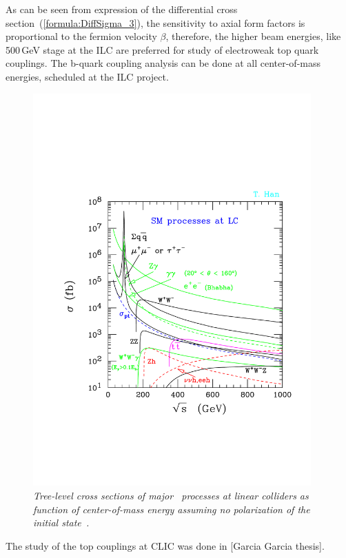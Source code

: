 As can be seen from expression of the differential cross section~(\ref{formula:DiffSigma_3}), the sensitivity to axial form factors is proportional to the fermion velocity $\beta$, therefore, the higher beam energies, like 500\,GeV stage at the ILC are preferred for study of electroweak top quark couplings. 
The b-quark coupling analysis can be done at all center-of-mass energies, scheduled at the ILC project.
\begin{figure}[h]
{\centering
    \includegraphics[clip, trim=0.5cm 5cm 0.5cm 7cm, width=0.95\textwidth]{ILD/graphics/epem_sm-hepph.pdf}
    \caption{\sl Tree-level cross sections of major \sm\ processes at linear colliders as function of center-of-mass energy assuming no polarization of the initial state~\cite{bib:Han}.}
    \label{fig:LCcrosssection}
  }
\end{figure}


The study of the top couplings at CLIC was done in [Garcia Garcia thesis]. 

